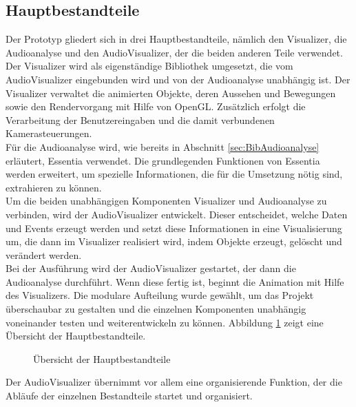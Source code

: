 \documentclass[11pt,a4paper]{article}
\begin{document}
\newpage
\subsection{Hauptbestandteile}
Der Prototyp gliedert sich in drei Hauptbestandteile, nämlich den Visualizer, die Audioanalyse und den AudioVisualizer, der die beiden anderen Teile verwendet. Der Visualizer wird als eigenständige Bibliothek umgesetzt, die vom AudioVisualizer eingebunden wird und von der Audioanalyse unabhängig ist. Der Visualizer verwaltet die animierten Objekte, deren Aussehen und Bewegungen sowie den Rendervorgang mit Hilfe von OpenGL. Zusätzlich erfolgt die Verarbeitung der Benutzereingaben und die damit verbundenen Kamerasteuerungen.\\
Für die Audioanalyse wird, wie bereits in Abschnitt \ref{sec:BibAudioanalyse} erläutert, Essentia verwendet. Die grundlegenden Funktionen von Essentia werden erweitert, um spezielle Informationen, die für die Umsetzung nötig sind, extrahieren zu können.\\
Um die beiden unabhängigen Komponenten Visualizer und Audioanalyse zu verbinden, wird der AudioVisualizer entwickelt. Dieser entscheidet, welche Daten und Events erzeugt werden und setzt diese Informationen in eine Visualisierung um, die dann im Visualizer realisiert wird, indem Objekte erzeugt, gelöscht und verändert werden.\\
Bei der Ausführung wird der AudioVisualizer gestartet, der dann die Audioanalyse durchführt. Wenn diese fertig ist, beginnt die Animation mit Hilfe des Visualizers. Die modulare Aufteilung wurde gewählt, um das Projekt überschaubar zu gestalten und die einzelnen Komponenten unabhängig voneinander testen und weiterentwickeln zu können. Abbildung \ref{fig:Hauptbestandteile} zeigt eine Übersicht der Hauptbestandteile.

\begin{figure}[!ht]
\centering
{}
\caption[Übersicht der Hauptbestandteile]{Übersicht der Hauptbestandteile}
\label{fig:Hauptbestandteile}
\end{figure}
\noindent
Der AudioVisualizer übernimmt vor allem eine organisierende Funktion, der die Abläufe der einzelnen Bestandteile startet und organisiert.
\end{document}
